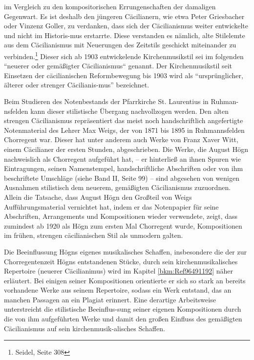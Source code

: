 im Vergleich zu den kompositorischen Errungenschaften der damaligen
Gegenwart. Es ist deshalb den jüngeren Cäcilianern, wie etwa Peter
Griesbacher oder Vinzenz Goller, zu verdanken, dass sich der
Cäcilianismus weiter entwickelte und nicht im Historis-mus erstarrte.
Diese verstanden es nämlich, alte Stilelemte aus dem Cäcilianismus mit
Neuerungen des Zeitstils geschickt miteinander zu verbinden.\footnote{
Seidel, Seite 308} Dieser sich ab 1903 entwickelende Kirchenmusikstil
sei im folgenden “neuerer oder gemäßigter Cäcilianismus“ genannt. Der
Kirchenmusikstil seit Einsetzen der cäcilianischen Reformbewegung bis
1903 wird als “ursprünglicher, älterer oder strenger Cäcilianis-mus”
bezeichnet.

Beim Studieren des Notenbestands der Pfarrkirche St. Laurentius in
Ruhman-nsfelden kann dieser stilistische Übergang nachvollzogen werden.
Den alten strengen Cäcilianismus repräsentiert das meist noch
handschriftlich angefertigte Notenmaterial des Lehrer Max Weigs, der
von 1871 bis 1895 in Ruhmannsfelden Chorregent war. Dieser hat unter
anderem auch Werke von Franz Xaver Witt, einem Cäcilianer der ersten
Stunden, abgeschrieben. Die Werke, die August Högn nachweislich als
Chorregent aufgeführt hat, – er hinterließ an ihnen Spuren wie
Eintragungen, seinen Namenstempel, handschriftliche Abschriften oder
von ihm beschriftete Umschläge (siehe Band II, Seite 99) – sind
abgesehen von wenigen Ausnahmen stilistisch dem neuerem, gemäßigten
Cäcilianismus zuzuordnen. Allein die Tatsache, dass August Högn den
Großteil von Weigs Aufführungsmaterial vernichtet hat, indem er das
Notenpapier für seine Abschriften, Arrangements und Kompositionen
wieder verwendete, zeigt, dass zumindest ab 1920 als Högn zum ersten
Mal Chorregent wurde, Kompositionen im frühen, strengen cäcilianischen
Stil als unmodern galten.

Die Beeinflussung Högns eigenes musikalisches Schaffen, insbesondere die
der zur Chorregentenzeit Högns entstandenen Stücke, durch sein
kirchenmusikalisches Repertoire (neuerer Cäcilianimus) wird im Kapitel
\ref{bkm:Ref96491192} näher erläutert. Bei einigen seiner Kompositionen
orientierte er sich so stark an bereits vorhandene Werke aus seinem
Repertoire, sodass ein Werk entstand, das an manchen Passagen an ein
Plagiat erinnert. Eine derartige Arbeitsweise unterstreicht die
stilistische Beeinflus-sung seiner eigenen Kompositionen durch die von
ihm aufgeführten Werke und damit den großen Einfluss des gemäßigten
Cäcilianismus auf sein kirchenmusik-alisches Schaffen.